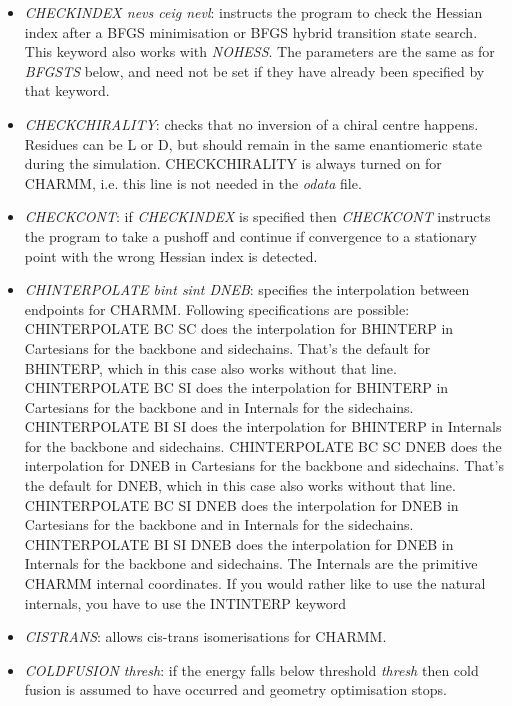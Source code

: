 \documentclass[12pt,a4paper,dvips]{article}
\begin{document}
\begin{itemize}
\item {\it CHECKINDEX nevs ceig nevl\/}: instructs the program to check the Hessian
index after a BFGS minimisation or BFGS hybrid transition
state search. This keyword also works with {\it NOHESS\/}.
The parameters are the same as for {\it BFGSTS\/} below, and need not be set
if they have already been specified by that keyword.

\item {\it CHECKCHIRALITY\/}: checks that no inversion of a chiral centre happens.
Residues can be L or D, but should remain in the same enantiomeric state during 
the simulation. CHECKCHIRALITY is always turned on for CHARMM, i.e. this line
is not needed in the {\it odata} file. 

\item {\it CHECKCONT\/}: if {\it CHECKINDEX\/} is specified then {\it CHECKCONT\/}
instructs the program to take a pushoff and continue if convergence to a stationary
point with the wrong Hessian index is detected. 

\item {\it CHINTERPOLATE bint sint DNEB\/}: specifies the interpolation between endpoints
for CHARMM. Following specifications are possible: CHINTERPOLATE BC SC does the 
interpolation for BHINTERP in Cartesians for the backbone and sidechains. 
That's the default for BHINTERP, which in this case also works without that line.
CHINTERPOLATE BC SI does the interpolation for BHINTERP in Cartesians for
the backbone and in Internals for the sidechains.
CHINTERPOLATE BI SI does the interpolation for BHINTERP in Internals for
the backbone and sidechains.
CHINTERPOLATE BC SC DNEB does the interpolation for DNEB in Cartesians for
the backbone and sidechains. That's the default for DNEB, which
in this case also works without that line.
CHINTERPOLATE BC SI DNEB does the interpolation for DNEB in Cartesians for
the backbone and in Internals for the sidechains.
CHINTERPOLATE BI SI DNEB does the interpolation for DNEB in Internals for
the backbone and sidechains.
The Internals are the primitive CHARMM internal coordinates. If you would rather like to
use the natural internals, you have to use the INTINTERP keyword

\item {\it CISTRANS\/}: allows cis-trans isomerisations for CHARMM.

\item {\it COLDFUSION thresh\/}: if the energy falls below threshold {\it thresh} then
cold fusion is assumed to have occurred and geometry optimisation stops.


\end{itemize}
\end{document}

